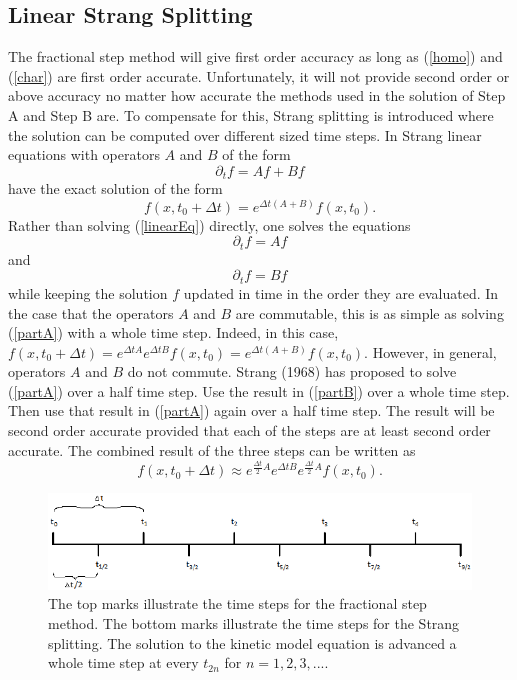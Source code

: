 \subsection{Linear Strang Splitting}
The fractional step method will give first order accuracy as long as (\ref{homo}) and (\ref{char}) are first order accurate. Unfortunately, it will not provide second order or above accuracy no matter how accurate the methods used in the solution of Step A and Step B are. To compensate for this, Strang splitting is introduced where the solution can be computed over different sized time steps. In Strang \cite{strang} linear equations with operators $A$ and $B$ of the form
%
\begin{equation}
\label{linearEq}
\partial_t f = A f + B f
\end{equation}
%
have the exact solution of the form
%
\begin{equation}
f(x,t_0 + \Delta t) = e^{\Delta t (A + B)}f(x,t_0).
\end{equation}
%
Rather than solving (\ref{linearEq}) directly, one solves the equations
%
\begin{equation}
\label{partA}
\partial_t f = A f
\end{equation}
%
and
%
\begin{equation}
\label{partB}
\partial_t f = B f
\end{equation}
%
while keeping the solution $f$ updated in time in the order they are evaluated. In the case that the operators $A$ and $B$ are commutable, this is as simple as solving (\ref{partA}) with a whole time step. Indeed, in this case, $f(x,t_0 + \Delta t) = e^{\Delta t A}e^{\Delta t B} f(x,t_0) = e^{\Delta t (A + B)} f(x,t_0)$. However, in general, operators $A$ and $B$ do not commute. Strang (1968) \cite{strang} has proposed to solve (\ref{partA}) over a half time step. Use the result in (\ref{partB}) over a whole time step. Then use that result in (\ref{partA}) again over a half time step. The result will be second order accurate provided that each of the steps are at least second order accurate. The combined result of the three steps can be written as
%
\begin{equation}
\label{Strang2}
f(x,t_0+\Delta t) \approx e^{\frac{\Delta t}{2} A} e^{\Delta t B} e^{\frac{\Delta t}{2} A} f(x,t_0).
\end{equation}
%
\begin{figure}[h!]
  \centering
      \includegraphics[angle=0,width=150mm]{strang/strang.pdf}
  \caption{\label{strang_interval} The top marks illustrate the time steps for the fractional step method. The bottom marks illustrate the time steps for the Strang splitting. The solution to the kinetic model equation is advanced a whole time step at every $t_{2n}$ for $n=1,2,3,...$.}
\end{figure}
